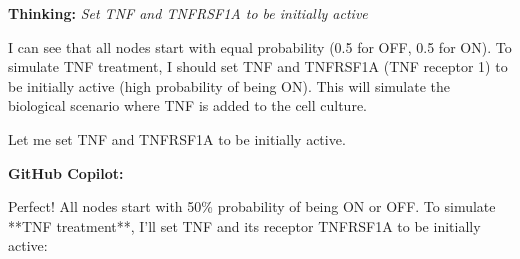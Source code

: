 \documentclass[11pt,a4paper]{article}
\begin{document}
\begin{thinkbox}
\textbf{Thinking:} \textit{Set TNF and TNFRSF1A to be initially active}

I can see that all nodes start with equal probability (0.5 for OFF, 0.5 for ON). To simulate TNF treatment, I should set TNF and TNFRSF1A (TNF receptor 1) to be initially active (high probability of being ON). This will simulate the biological scenario where TNF is added to the cell culture.

Let me set TNF and TNFRSF1A to be initially active.

\end{thinkbox}
\begin{copilotbox}
\textbf{GitHub Copilot:}

Perfect! All nodes start with 50\% probability of being ON or OFF. To simulate **TNF treatment**, I'll set TNF and its receptor TNFRSF1A to be initially active:

\end{copilotbox}
\end{document}
